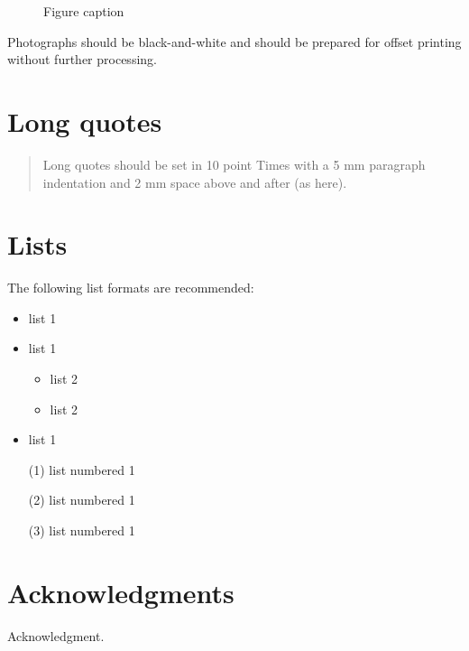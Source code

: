\documentclass{ecscw2007}
\begin{document}
\begin{figure}[htb]
  \centering
  \caption{Figure caption}
  \label{fig:figure}
\end{figure}

Photographs should be black-and-white and should be prepared for offset 
printing without further processing. 

\section*{Long quotes} 

\begin{quote}
  Long quotes should be set in 10 point Times with a 5 mm paragraph indentation and 2 mm 
space above and after  (as here). 
\end{quote}

\section*{Lists} 
The following list formats are recommended: 
\begin{itemize}
\item list 1
\item list 1
  \begin{itemize}
  \item list 2
  \item list 2
  \end{itemize}
\item list 1 
\end{itemize}

\begin{itemize}
\item[(1)] list numbered 1 
\item[(2)] list numbered 1 
\item[(3)] list numbered 1 
\end{itemize}



\section*{Acknowledgments} 

{\footnotesize Acknowledgment. }




  
\end{document}
